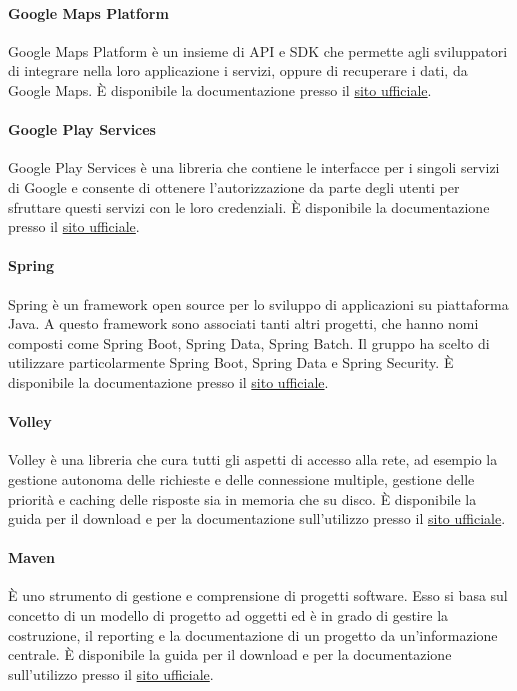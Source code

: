 \paragraph{Google Maps Platform}
Google Maps Platform è un insieme di API e SDK che permette agli sviluppatori di integrare nella loro applicazione i servizi, oppure di recuperare i dati, da Google Maps.
È disponibile la documentazione presso il \href{https://cloud.google.com/maps-platform?hl=it}{sito ufficiale}.

\paragraph{Google Play Services}
Google Play Services è una libreria che contiene le interfacce per i singoli servizi di Google e consente di ottenere l'autorizzazione da parte degli utenti per sfruttare questi servizi con le loro credenziali.
È disponibile la documentazione presso il \href{https://developers.google.com/android/guides/overview}{sito ufficiale}.

\paragraph{Spring}
Spring è un framework open source per lo sviluppo di applicazioni su piattaforma Java.
A questo framework sono associati tanti altri progetti, che hanno nomi composti come Spring Boot, Spring Data, Spring Batch. Il gruppo ha scelto di utilizzare particolarmente Spring Boot, Spring Data e Spring Security.
È disponibile la documentazione presso il \href{https://spring.io/}{sito ufficiale}.

\paragraph{Volley}
Volley è una libreria che cura tutti gli aspetti di accesso alla rete, ad esempio la gestione autonoma delle richieste e delle connessione multiple, gestione delle priorità e caching delle risposte sia in memoria che su disco.
È disponibile la guida per il download e per la documentazione sull'utilizzo presso il \href{https://developer.android.com/training/volley}{sito ufficiale}.

\paragraph{Maven}
È uno strumento di gestione e comprensione di progetti software. Esso si basa sul concetto di un modello di progetto ad oggetti ed è in grado di gestire la costruzione, 
il reporting e la documentazione di un progetto da un'informazione centrale.
È disponibile la guida per il download e per la documentazione sull'utilizzo presso il \href{https://maven.apache.org/}{sito ufficiale}.

